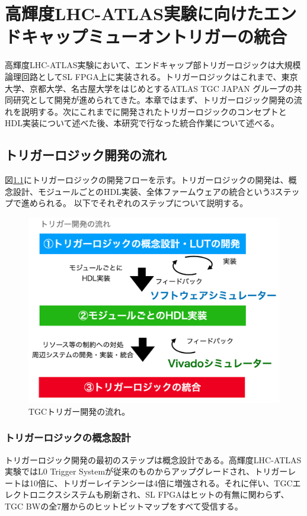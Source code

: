 \chapter{高輝度LHC-ATLAS実験に向けたエンドキャップミューオントリガーの統合}
\label{chap_TriggerIntegration}
高輝度LHC-ATLAS実験において、エンドキャップ部トリガーロジックは大規模論理回路としてSL FPGA上に実装される。トリガーロジックはこれまで、東京大学、京都大学、名古屋大学をはじめとするATLAS TGC JAPAN グループの共同研究として開発が進められてきた。本章ではまず、トリガーロジック開発の流れを説明する。次にこれまでに開発されたトリガーロジックのコンセプトとHDL実装について述べた後、本研究で行なった統合作業について述べる。

\section{トリガーロジック開発の流れ}
\label{sec_TriggerTestSystem}
図\ref{Trigger_flow}にトリガーロジックの開発フローを示す。トリガーロジックの開発は、概念設計、モジュールごとのHDL実装、全体ファームウェアの統合という3ステップで進められる。
以下でそれぞれのステップについて説明する。

\begin{figure} 
\centering
\includegraphics[width=16cm]{fig/SL/Trigger_flow.png}
\caption[TGCトリガー開発の流れ]{TGCトリガー開発の流れ。}
\label{Trigger_flow}
\end{figure}

\subsection*{トリガーロジックの概念設計}
トリガーロジック開発の最初のステップは概念設計である。高輝度LHC-ATLAS実験ではL0 Trigger Systemが従来のものからアップグレードされ、トリガーレートは10倍に、トリガーレイテンシーは4倍に増強される。それに伴い、TGCエレクトロニクスシステムも刷新され、SL FPGAはヒットの有無に関わらず、TGC BWの全7層からのヒットビットマップをすべて受信する。

